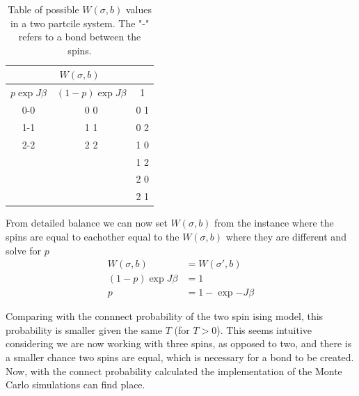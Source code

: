 \begin{table}[]
    \def\arraystretch{1.25}
    \centering
    \begin{tabular}{|ccc|}
        \hline
        \multicolumn{3}{|c|}{$W(\sigma, b)$}                                                                                                      \\ \hline
        \multicolumn{1}{|c|}{$p \exp{J \beta}$} & \multicolumn{1}{c|}{$(1-p) \exp{J \beta}$} & 1   \\ \hline
        \multicolumn{1}{|c|}{0-0}                                             & \multicolumn{1}{c|}{0 0}                                                 & 0 1 \\ \hline
        \multicolumn{1}{|c|}{1-1}                                             & \multicolumn{1}{c|}{1 1}                                                 & 0 2 \\ \hline
        \multicolumn{1}{|c|}{2-2}                                             & \multicolumn{1}{c|}{2 2}                                                 & 1 0 \\ \hline
        \multicolumn{1}{|c|}{}                                                & \multicolumn{1}{c|}{}                                                    & 1 2 \\ \hline
        \multicolumn{1}{|c|}{}                                                & \multicolumn{1}{c|}{}                                                    & 2 0 \\ \hline
        \multicolumn{1}{|c|}{}                                                & \multicolumn{1}{c|}{}                                                    & 2 1 \\ \hline
    \end{tabular}
    \caption{Table of possible $W(\sigma,b)$ values in a two partcile system. The "-" refers to a bond between the spins.}
    \label{tab:W}
\end{table}

From detailed balance we can now set $W(\sigma, b)$ from the instance where the spins are equal to eachother equal to the $W(\sigma, b)$ where they are different and solve for $p$
\begin{align*}
    W(\sigma, b) &= W(\sigma', b)\\
    (1-p) \exp{J \beta} &= 1\\
    p &= 1 - \exp{-J \beta} 
\end{align*}

Comparing with the connnect probability of the two spin ising model, this probability is smaller given the same $T$ (for $T>0$). This seems intuitive considering we are now working with three spins, as opposed to two, and there is a smaller chance two spins are equal, which is necessary for a bond to be created.\\ 
Now, with the connect probability calculated the implementation of the Monte Carlo simulations can find place. 


